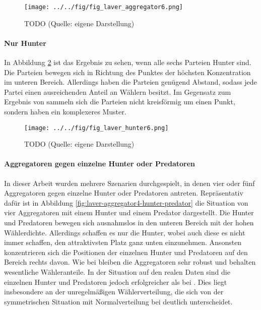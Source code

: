 \begin{figure}[htb]
	\centering
	\texttt{[image: ../../fig/fig\_laver\_aggregator6.png]}
	\caption{TODO (Quelle: eigene Darstellung)}
	\label{fig:laver-aggregator6}
\end{figure}

\paragraph{Nur Hunter}

In Abbildung \ref{fig:laver-hunter6} ist das Ergebnis zu sehen, wenn alle sechs Parteien Hunter sind. Die Parteien bewegen sich in Richtung des Punktes der höchsten Konzentration im unteren Bereich. Allerdings haben die Parteien genügend Abstand, sodass jede Partei einen ausreichenden Anteil an Wählern besitzt. Im Gegensatz zum Ergebnis von \citet{laver2005policy} sammeln sich die Parteien nicht kreisförmig um einen Punkt, sondern haben ein komplexeres Muster.

\begin{figure}[htb]
	\centering
	\texttt{[image: ../../fig/fig\_laver\_hunter6.png]}
	\caption{TODO (Quelle: eigene Darstellung)}
	\label{fig:laver-hunter6}
\end{figure}

\paragraph{Aggregatoren gegen einzelne Hunter oder Predatoren}

In dieser Arbeit wurden mehrere Szenarien durchgespielt, in denen vier oder fünf Aggregatoren gegen einzelne Hunter oder Predatoren antreten.
Repräsentativ dafür ist in Abbildung \ref{fig:laver-aggregator4-hunter-predator} die Situation von vier Aggregatoren mit einem Hunter und einem Predator dargestellt.
Die Hunter und Predatoren bewegen sich ausnahmslos in den unteren Bereich mit der hohen Wählerdichte.
Allerdings schaffen es nur die Hunter, wobei auch diese es nicht immer schaffen, den attraktivsten Platz ganz unten einzunehmen.
Ansonsten konzentrieren sich die Positionen der einzelnen Hunter und Predatoren auf den Bereich rechts davon.
Wie bei \citet{laver2005policy} bleiben die Aggregatoren sehr robust und behalten wesentliche Wähleranteile.
In der Situation auf den realen Daten sind die einzelnen Hunter und Predatoren jedoch erfolgreicher als bei \citet{laver2005policy}.
Dies liegt insbesondere an der unregelmäßigen Wählerverteilung, die sich von der symmetrischen Situation mit Normalverteilung bei \citet{laver2005policy} deutlich unterscheidet.

